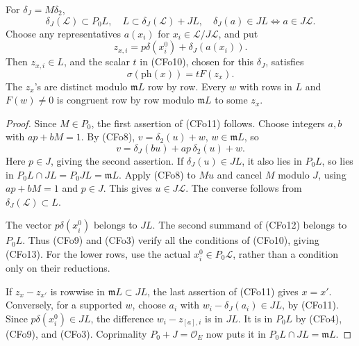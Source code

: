 \begin{srlemma}
\label{lem:ftb-cover-coefficient-reps}
For \(\delta_J=M\delta_2\),
\[
 \delta_J(\mathcal L)\subset P_0L,\quad
 L\subset\delta_J(\mathcal L)+JL,\quad
 \delta_J(a)\in JL\Longleftrightarrow a\in J\mathcal L.     \tag{CFo11}
\]
Choose any representatives \(a(x_i)\) for \(x_i\in\mathcal L/J\mathcal L\),
and put
\[
                    z_{x,i}=p\delta(x^0_i)+\delta_J(a(x_i)).
                                                               \tag{CFo12}
\]
Then \(z_{x,i}\in L\), and the scalar \(t\) in (CFo10), chosen
for this \(\delta_J\), satisfies
\[
                          \sigma(\mathrm{ph}(x))=tF(z_x).
                                                               \tag{CFo13}
\]
The \(z_x\)'s are distinct modulo \(\mathfrak mL\) row by row.
Every \(w\) with rows in \(L\) and \(F(w)\ne0\) is congruent
row by row modulo \(\mathfrak mL\) to some \(z_x\).
\end{srlemma}

\begin{proof}
Since \(M\in P_0\), the first assertion of (CFo11) follows.
Choose integers \(a,b\) with \(ap+bM=1\).
By (CFo8), \(v=\delta_2(u)+w\), \(w\in\mathfrak mL\), so
\[
                 v=\delta_J(bu)+ap\,\delta_2(u)+w.
\]
Here \(p\in J\), giving the second assertion.
If \(\delta_J(u)\in JL\), it also lies in \(P_0L\), so lies
in \(P_0L\cap JL=P_0JL=\mathfrak mL\).
Apply (CFo8) to \(Mu\) and cancel \(M\) modulo \(J\), using
\(ap+bM=1\) and \(p\in J\). This gives \(u\in J\mathcal L\).
The converse follows from \(\delta_J(\mathcal L)\subset L\).

The vector \(p\delta(x^0_i)\) belongs to \(JL\).
The second summand of (CFo12) belongs to \(P_0L\).
Thus (CFo9) and (CFo3) verify all the conditions of (CFo10),
giving (CFo13). For the lower rows, use the actual
\(x^0_i\in P_0\mathcal L\), rather than a condition only on
their reductions.

If \(z_x-z_{x'}\) is rowwise in \(\mathfrak mL\subset JL\),
the last assertion of (CFo11) gives \(x=x'\).
Conversely, for a supported \(w\), choose \(a_i\) with
\(w_i-\delta_J(a_i)\in JL\), by (CFo11).
Since \(p\delta(x^0_i)\in JL\), the difference
\(w_i-z_{[a],i}\) is in \(JL\).
It is in \(P_0L\) by (CFo4), (CFo9), and (CFo3).
Coprimality \(P_0+J=\mathcal O_E\) now puts it in
\(P_0L\cap JL=\mathfrak mL\).
\end{proof}

